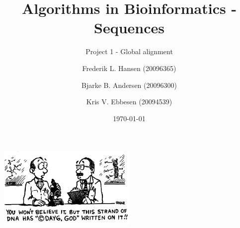 \documentclass[a4paper, 12pt]{scrartcl}
\title{Algorithms in Bioinformatics - Sequences}
\subtitle{Project 1 - Global alignment}
\date{\today}
\author{Frederik L. Hansen (20096365)
\and
Bjarke B. Andersen (20096300)
\and
Kris V. Ebbesen (20094539)
}
\begin{document}
\maketitle
\begin{center}
	\includegraphics[width=0.5\textwidth]{day6.png}
\end{center}
\newpage
\tableofcontents
\newpage















 
\end{document}

